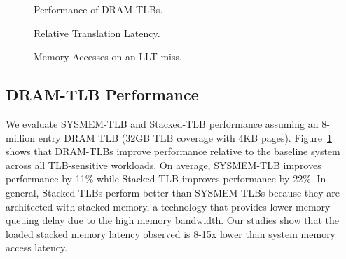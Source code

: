 \begin{figure}[tp] 
  \vspace{-0.in} \centering
  \centerline{}

  \caption{\small Performance of DRAM-TLBs. \normalsize}
  \label{fig:perf_DRAMTLB} 
  \vspace{0.2 in}
\end{figure}

\begin{figure}[tp] 
  \vspace{0.in} \centering
  \centerline{}

  \caption{\small Relative Translation Latency.\normalsize}
  \label{fig:tlblat_DRAMTLB} 
\end{figure}

\begin{figure}[b] 
  \vspace{0.2in} \centering
  \centerline{}

  \caption{\small Memory Accesses on an LLT miss.\normalsize}
 \label{fig:memaccess_DRAMTLB} 
  \vspace{0.0 in}
\end{figure}

\subsection{DRAM-TLB Performance}





\noindent We evaluate SYSMEM-TLB and Stacked-TLB performance assuming
an 8-million entry DRAM TLB (32GB TLB coverage with 4KB pages).
Figure~\ref{fig:perf_DRAMTLB} shows that DRAM-TLBs improve performance
relative to the baseline system across all TLB-sensitive workloads. On
average, SYSMEM-TLB improves performance by 11\% while Stacked-TLB
improves performance by 22\%. In general, Stacked-TLBs perform better
than SYSMEM-TLBs because they are architected with stacked memory, a
technology that provides lower memory queuing delay due to the high
memory bandwidth. Our studies show that the loaded stacked memory
latency observed is 8-15x lower than system memory access latency.

